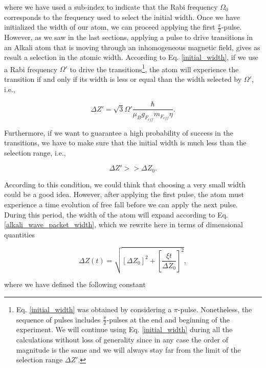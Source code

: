 \documentclass{article}
\begin{document}
where we have used a sub-index to indicate that the Rabi frequency $\Omega_{0}$ corresponds to the frequency used to select the initial width. 
Once we have initialized the width of our atom, we can proceed applying the first $\frac{\pi}{2}$-pulse. However, as we saw in the last sections, applying a pulse to drive transitions in an Alkali atom that is moving through an inhomogeneous magnetic field, gives as result a selection in the atomic width. According to Eq. \ref{initial_width}, if we use a Rabi frequency $\Omega'$ to drive the transitions\footnote{Eq. \ref{initial_width} was obtained by considering a $\pi$-pulse. Nonetheless, the sequence of pulses includes $\frac{\pi}{2}$-pulses at the end and beginning of the experiment. We will continue using Eq. \ref{initial_width} during all the calculations without loss of generality since in any case the order of magnitude is the same and we will always stay far from the limit of the selection range $\Delta Z'$.}, the atom will experience the transition if and only if its width is less or equal than the width selected by $\Omega'$, i.e.,

\begin{equation}\label{maximum_width_rabi_frequency}
    \Delta Z' = \sqrt{3} \Omega' \frac{\hbar}{\mu_{B} g_{F_{eff}} m_{F_{eff}} \eta}.
\end{equation}

Furthermore, if we want to guarantee a high probability of success in the transitions, we have to make sure that the initial width is much less than the selection range, i.e.,

\begin{equation}\label{condition_Dz'>>Dz0}
    \Delta Z' >> \Delta Z_{0}.
\end{equation}

According to this condition, we could think that choosing a very small width could be a good idea. However, after applying the first pulse, the atom must experience a time evolution of free fall before we can apply the next pulse. During this period, the width of the atom will expand according to Eq. \ref{alkali_wave_packet_width}, which we rewrite here in terms of dimensional quantities

\begin{equation}\label{final_width_dimensional}
\Delta Z (t) = \sqrt{[\Delta Z_{0}]^{2} + \left[\frac{\xi t}{\Delta Z_{0}} \right]^{2}},
\end{equation}

where we have defined the following constant
\end{document}
